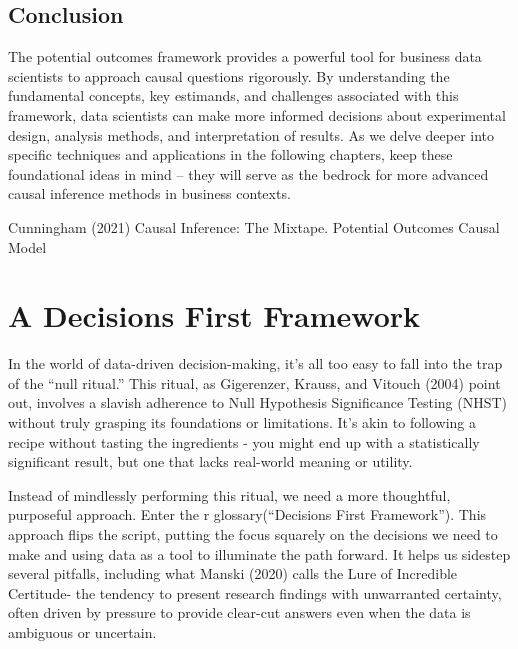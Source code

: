 \documentclass[
  letterpaper,
  DIV=11,
  numbers=noendperiod]{scrreprt}
\begin{document}
\section{Conclusion}\label{conclusion}

The potential outcomes framework provides a powerful tool for business
data scientists to approach causal questions rigorously. By
understanding the fundamental concepts, key estimands, and challenges
associated with this framework, data scientists can make more informed
decisions about experimental design, analysis methods, and
interpretation of results. As we delve deeper into specific techniques
and applications in the following chapters, keep these foundational
ideas in mind -- they will serve as the bedrock for more advanced causal
inference methods in business contexts.

\begin{tcolorbox}[enhanced jigsaw, colframe=quarto-callout-tip-color-frame, left=2mm, toprule=.15mm, colbacktitle=quarto-callout-tip-color!10!white, title=\textcolor{quarto-callout-tip-color}{\faLightbulb}\hspace{0.5em}{Learn more}, coltitle=black, rightrule=.15mm, leftrule=.75mm, colback=white, arc=.35mm, bottomtitle=1mm, bottomrule=.15mm, breakable, titlerule=0mm, opacitybacktitle=0.6, toptitle=1mm, opacityback=0]

Cunningham (2021) Causal Inference: The Mixtape. Potential Outcomes
Causal Model

\end{tcolorbox}

\chapter{A Decisions First Framework}\label{a-decisions-first-framework}

In the world of data-driven decision-making, it's all too easy to fall
into the trap of the ``null ritual.'' This ritual, as Gigerenzer,
Krauss, and Vitouch (2004) point out, involves a slavish adherence to
Null Hypothesis Significance Testing (NHST) without truly grasping its
foundations or limitations. It's akin to following a recipe without
tasting the ingredients - you might end up with a statistically
significant result, but one that lacks real-world meaning or utility.

Instead of mindlessly performing this ritual, we need a more thoughtful,
purposeful approach. Enter the r glossary(``Decisions First
Framework''). This approach flips the script, putting the focus squarely
on the decisions we need to make and using data as a tool to illuminate
the path forward. It helps us sidestep several pitfalls, including what
Manski (2020) calls the Lure of Incredible Certitude- the tendency to
present research findings with unwarranted certainty, often driven by
pressure to provide clear-cut answers even when the data is ambiguous or
uncertain.
\end{document}
